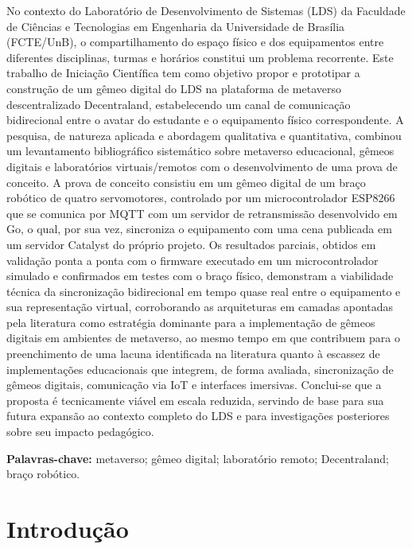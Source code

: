 \documentclass[12pt]{article}
\begin{document}
No contexto do Laboratório de Desenvolvimento de Sistemas (LDS) da Faculdade de Ciências e Tecnologias em Engenharia da Universidade de Brasília (FCTE/UnB), o compartilhamento do espaço físico e dos equipamentos entre diferentes disciplinas, turmas e horários constitui um problema recorrente. Este trabalho de Iniciação Científica tem como objetivo propor e prototipar a construção de um gêmeo digital do LDS na plataforma de metaverso descentralizado Decentraland, estabelecendo um canal de comunicação bidirecional entre o avatar do estudante e o equipamento físico correspondente. A pesquisa, de natureza aplicada e abordagem qualitativa e quantitativa, combinou um levantamento bibliográfico sistemático sobre metaverso educacional, gêmeos digitais e laboratórios virtuais/remotos com o desenvolvimento de uma prova de conceito. A prova de conceito consistiu em um gêmeo digital de um braço robótico de quatro servomotores, controlado por um microcontrolador ESP8266 que se comunica por MQTT com um servidor de retransmissão desenvolvido em Go, o qual, por sua vez, sincroniza o equipamento com uma cena publicada em um servidor Catalyst do próprio projeto. Os resultados parciais, obtidos em validação ponta a ponta com o firmware executado em um microcontrolador simulado e confirmados em testes com o braço físico, demonstram a viabilidade técnica da sincronização bidirecional em tempo quase real entre o equipamento e sua representação virtual, corroborando as arquiteturas em camadas apontadas pela literatura como estratégia dominante para a implementação de gêmeos digitais em ambientes de metaverso, ao mesmo tempo em que contribuem para o preenchimento de uma lacuna identificada na literatura quanto à escassez de implementações educacionais que integrem, de forma avaliada, sincronização de gêmeos digitais, comunicação via IoT e interfaces imersivas. Conclui-se que a proposta é tecnicamente viável em escala reduzida, servindo de base para sua futura expansão ao contexto completo do LDS e para investigações posteriores sobre seu impacto pedagógico.
 
\vspace{0.5cm}
\noindent \textbf{Palavras-chave:} metaverso; gêmeo digital; laboratório remoto; Decentraland; braço robótico.

\newpage

\section{Introdução}
\label{intro}
\end{document}
